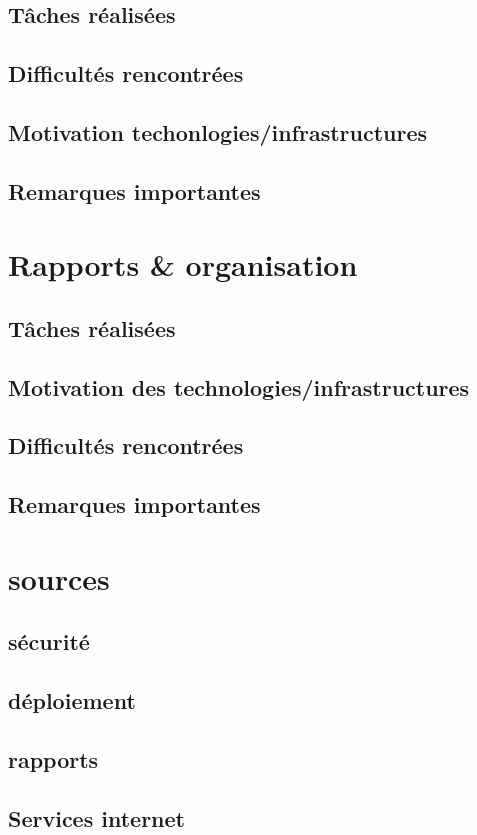 \documentclass{article}
\begin{document}
    \subsection{Tâches réalisées} 
       
    \subsection{Difficultés rencontrées}
    
    \subsection{Motivation techonlogies/infrastructures}
   
    \subsection{Remarques importantes}
 
\section{Rapports \& organisation}

    \subsection{Tâches réalisées} 
   
    \subsection{Motivation des technologies/infrastructures}
   
    \subsection{Difficultés rencontrées} 
    
    \subsection{Remarques importantes}

\section{sources}

    \subsection{sécurité}
   
    \subsection{déploiement}
   
    \subsection{rapports}
       
    \subsection{Services internet}
   
\end{document}
